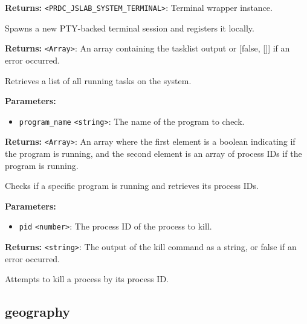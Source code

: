\documentclass[12pt,a4paper]{article}
\begin{document}
\noindent \textbf{Returns:} \texttt{<PRDC\_JSLAB\_SYSTEM\_TERMINAL>}: Terminal wrapper instance.

\noindent Spawns a new PTY-backed terminal session and registers it locally.

\vspace{5mm}
\noindent {}


\noindent \textbf{Returns:} \texttt{<Array>}: An array containing the tasklist output or [false, []] if an error occurred.

\noindent Retrieves a list of all running tasks on the system.

\vspace{5mm}
\noindent {}


\noindent \textbf{Parameters:}
\begin{itemize}
  \item \texttt{program\_name} \texttt{<string>}: The name of the program to check.
\end{itemize}

\noindent \textbf{Returns:} \texttt{<Array>}: An array where the first element is a boolean indicating if the program is running,
and the second element is an array of process IDs if the program is running.

\noindent Checks if a specific program is running and retrieves its process IDs.

\vspace{5mm}
\noindent {}


\noindent \textbf{Parameters:}
\begin{itemize}
  \item \texttt{pid} \texttt{<number>}: The process ID of the process to kill.
\end{itemize}

\noindent \textbf{Returns:} \texttt{<string>}: The output of the kill command as a string, or false if an error occurred.

\noindent Attempts to kill a process by its process ID.


\subsection{geography}
\vspace{5mm}
\noindent {}
\end{document}
